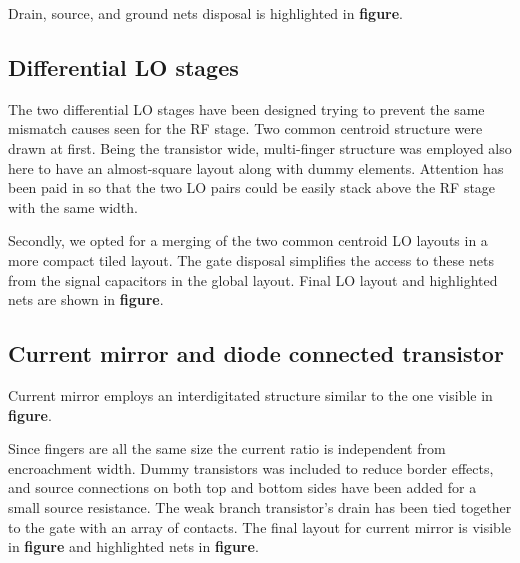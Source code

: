 Drain, source, and ground nets disposal is highlighted in \textbf{figure}. %

\subsection{Differential LO stages}
The two differential LO stages have been designed trying to prevent the same mismatch causes seen for the RF stage. Two common centroid structure were drawn at first. Being the transistor wide, multi-finger structure was employed also here to have an almost-square layout along with dummy elements. Attention has been paid in so that the two LO pairs could be easily stack above the RF stage with the same width. 


Secondly, we opted for a merging of the two common centroid LO layouts in a more compact tiled layout. The gate disposal simplifies the access to these nets from the signal capacitors in the global layout. Final LO layout and highlighted nets are shown in \textbf{figure}.

\subsection{Current mirror and diode connected transistor}
Current mirror employs an interdigitated structure similar to the one visible in \textbf{figure}.

Since fingers are all the same size the current ratio is independent from encroachment width. Dummy transistors was included to reduce border effects, and source connections on both top and bottom sides have been added for a small source resistance. The weak branch transistor's drain has been tied together to the gate with an array of contacts. The final layout for current mirror is visible in \textbf{figure} and highlighted nets in \textbf{figure}.

